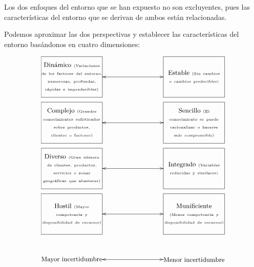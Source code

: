 \documentclass[10pt,a4paper,spanish]{report}
\begin{document}
            Los dos enfoques del entorno que se han expuesto no son excluyentes, pues las características del entorno que se derivan de ambos están relacionadas.

            Podemos aproximar las dos perspectivas y establecer las características del entorno basándonos en cuatro dimensiones:

            \[\begin{xy}
            ,(0,0)*+=<20mm>[F]\txt<3cm>{{\small Dinámico} {\tiny (Variaciones de los factores del entorno, numerosas, profundas, rápidas e impredecibles)}}
            \ar@{<->}
            ,(60,0)*+=<20mm>[F]\txt<3cm>{{\small Estable} {\tiny (Sin cambios o cambios predecibles)}}
            \end{xy}\]
            \[\begin{xy}
            ,(0,0)*+=<20mm>[F]\txt<3cm>{{\small Complejo} {\tiny (Grandes conocimientos sofisticados sobre productos, clientes o factores)}}
            \ar@{<->}
            ,(60,0)*+=<20mm>[F]\txt<3cm>{{\small Sencillo} {\tiny (El conocimiento se puede racionalizar o hacerse más comprensible)}}
            \end{xy}\]
            \[\begin{xy}
            ,(0,0)*+=<20mm>[F]\txt<3cm>{{\small Diverso} {\tiny (Gran número de clientes, productos, servicios o zonas geográficas que abastecer)}}
            \ar@{<->}
            ,(60,0)*+=<20mm>[F]\txt<3cm>{{\small Integrado} {\tiny (Variables reducidas y similares)}}
            \end{xy}\]
            \[\begin{xy}
            ,(0,0)*+=<20mm>[F]\txt<3cm>{{\small Hostil} {\tiny (Mayor competencia y disponibilidad de recursos)}}
            \ar@{<->}
            ,(60,0)*+=<20mm>[F]\txt<3cm>{{\small Munificiente} {\tiny (Menor competencia y disponibilidad de recursos)}}
            \end{xy}\]
            \[\begin{xy}
            ,(0,0)*+=<20mm>[]\txt{{\small Mayor incertidumbre}}
            \ar@{<->}
            ,(60,0)*+=<20mm>[]\txt{{\small Menor incertidumbre}}
            \end{xy}\]
\end{document}
